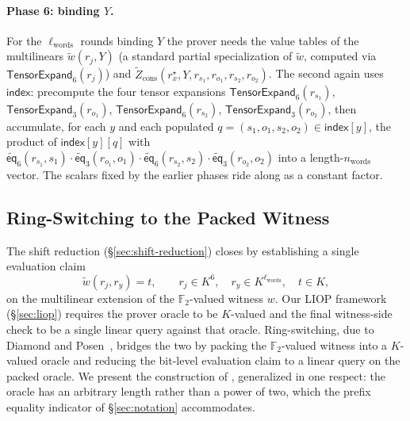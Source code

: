 \documentclass{article}
\theoremstyle{definition}
\newcommand*{\mle}{\widetilde}
\newcommand{\eq}{\mathsf{eq}}
\newcommand{\FF}[1]{\mathbb{F}_{#1}}
\begin{document}
\paragraph{Phase 6: binding $Y$.}
For the $\ell_\text{words}$ rounds binding $Y$ the prover needs the value tables of the multilinears $\mle{w}(r_j, Y)$ (a standard partial specialization of $\mle{w}$, computed via $\textsf{TensorExpand}_6(r_j)$) and $\mle{Z}_\text{cons}(r^\star_x, Y, r_{s_1}, r_{o_1}, r_{s_2}, r_{o_2})$. The second again uses $\textsf{index}$: precompute the four tensor expansions $\textsf{TensorExpand}_6(r_{s_1})$, $\textsf{TensorExpand}_3(r_{o_1})$, $\textsf{TensorExpand}_6(r_{s_2})$, $\textsf{TensorExpand}_3(r_{o_2})$, then accumulate, for each $y$ and each populated $q = (s_1, o_1, s_2, o_2) \in \textsf{index}[y]$, the product of $\textsf{index}[y][q]$ with $\mle{\eq}_6(r_{s_1}, s_1) \cdot \mle{\eq}_3(r_{o_1}, o_1) \cdot \mle{\eq}_6(r_{s_2}, s_2) \cdot \mle{\eq}_3(r_{o_2}, o_2)$ into a length-$n_\text{words}$ vector. The scalars fixed by the earlier phases ride along as a constant factor.

\subsection{Ring-Switching to the Packed Witness}
\label{sec:ring-switching}

The shift reduction (\S\ref{sec:shift-reduction}) closes by establishing a single evaluation claim
\[
  \mle{w}(r_j, r_y) = t, \qquad r_j \in K^6, \quad r_y \in K^{\ell_\text{words}}, \quad t \in K,
\]
on the multilinear extension of the $\FF{2}$-valued witness $w$. Our LIOP framework (\S\ref{sec:liop}) requires the prover oracle to be $K$-valued and the final witness-side check to be a single linear query against that oracle. Ring-switching, due to Diamond and Posen~\cite{Diamond:2024ab}, bridges the two by packing the $\FF{2}$-valued witness into a $K$-valued oracle and reducing the bit-level evaluation claim to a linear query on the packed oracle. We present the construction of \cite[Construction~3.1]{Diamond:2024ab}, generalized in one respect: the oracle has an arbitrary length rather than a power of two, which the prefix equality indicator of \S\ref{sec:notation} accommodates.
\end{document}
